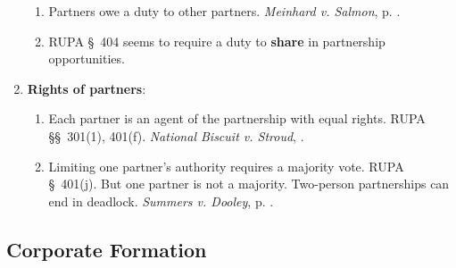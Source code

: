 \begin{enumerate}
    \begin{enumerate}
        \item Partners owe a duty to other partners. \emph{Meinhard v. 
        Salmon}, p. \pageref{par:meinhard}.
        \item RUPA \S\ 404 seems to require a duty to \textbf{share} in 
        partnership opportunities.
    \end{enumerate}
    \item \textbf{Rights of partners}:
    \begin{enumerate}
        \item Each partner is an agent of the partnership with equal rights.  
        RUPA \S\S\ 301(1), 401(f). \emph{National Biscuit v. Stroud}, 
        \pageref{par:biscuit}.
        \item Limiting one partner's authority requires a majority vote. RUPA 
        \S\ 401(j). But one partner is not a majority. Two-person partnerships 
        can end in deadlock. \emph{Summers v. Dooley}, p.  
        \pageref{par:summers}.
    \end{enumerate}
\end{enumerate}

\newpage

\subsection{Corporate Formation}


